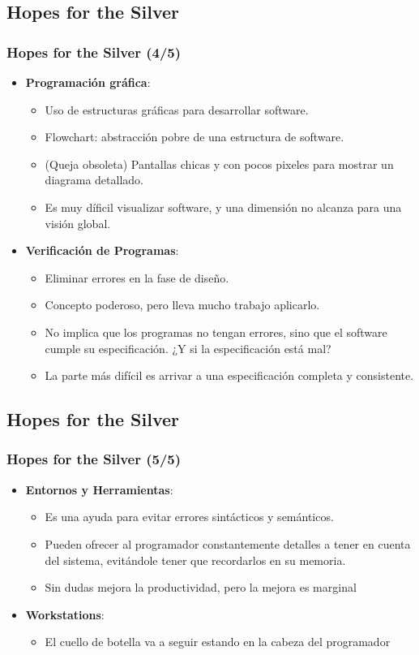 \documentclass{beamer}
\begin{document}
\subsection*{Hopes for the Silver}
\begin{frame}
  \frametitle{Hopes for the Silver (4/5)}
  \begin{itemize}
    \item \textbf{Programación gráfica}:	
      \begin{itemize}
	\item Uso de estructuras gráficas para desarrollar software.
	\item Flowchart: abstracción pobre de una estructura de software.
	\item (Queja obsoleta) Pantallas chicas y con pocos pixeles para mostrar un diagrama detallado.
	\item Es muy díficil visualizar software, y una dimensión no alcanza para una visión global.
      \end{itemize}
    \item \textbf{Verificación de Programas}:
      \begin{itemize}
	\item Eliminar errores en la fase de diseño.
	\item Concepto poderoso, pero lleva mucho trabajo aplicarlo.
	\item No implica que los programas no tengan errores, sino que el software cumple su especificación. ¿Y si la especificación está mal? \item La parte más difícil es arrivar a una especificación completa y consistente.
      \end{itemize}
  \end{itemize}
\end{frame}


\subsection*{Hopes for the Silver}
\begin{frame}
  \frametitle{Hopes for the Silver (5/5)}
  \begin{itemize}
    \item \textbf{Entornos y Herramientas}:
      \begin{itemize}
	\item Es una ayuda para evitar errores sintácticos y semánticos.
	\item Pueden ofrecer al programador constantemente detalles a tener en cuenta del sistema, evitándole tener que recordarlos en su memoria.
	\item Sin dudas mejora la productividad, pero la mejora es marginal
      \end{itemize}
    \item \textbf{Workstations}:
      \begin{itemize}
	\item El cuello de botella va a seguir estando en la cabeza del programador
      \end{itemize}
  \end{itemize}
\end{frame}
\end{document}
